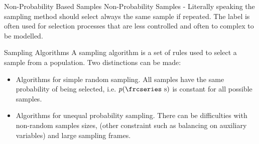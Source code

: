\documentclass{beamer}\usepackage[]{graphicx}\usepackage[]{color}
\newcommand{\textfrc}[1]{{\frcseries#1}}
\newcommand{\mathfrc}[1]{\text{\textfrc{#1}}}
\begin{document}
\begin{frame}{Non-Probability Based Samples}
Non-Probability Samples - Literally speaking the sampling method should select always the same sample if repeated. The label is often used for selection processes that are less controlled and often to complex to be modelled. 
\end{frame}



\begin{frame}{Sampling Algorithms}
A sampling algorithm is a set of rules used to select a sample from a population. Two distinctions can be made:
\begin{itemize}
\item<2-> Algorithms for simple random sampling. 
All samples have the same probability of being selected, i.e. $p(\mathfrc{s})$ is constant for all possible samples.
\item<3-> Algorithms for unequal probability sampling. There can be difficulties with non-random samples sizes, (other constraint such as balancing on auxiliary variables) and large sampling frames.
\end{itemize}

\end{frame}
\end{document}
